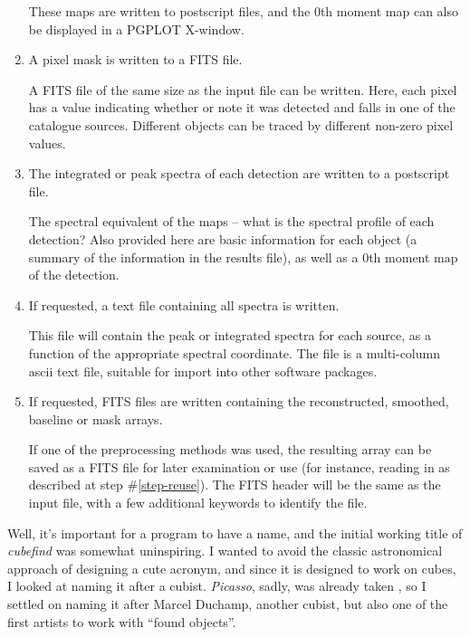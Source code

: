 \begin{enumerate}
  These maps are written to postscript files, and the 0th moment map
  can also be displayed in a PGPLOT X-window.

\item A pixel mask is written to a FITS file.

  A FITS file of the same size as the input file can be written. Here,
  each pixel has a value indicating whether or note it was detected
  and falls in one of the catalogue sources. Different objects can be
  traced by different non-zero pixel values.

\item The integrated or peak spectra of each detection are written to a
  postscript file. 

  The spectral equivalent of the maps -- what is the spectral profile
  of each detection? Also provided here are basic information for each
  object (a summary of the information in the results file), as well
  as a 0th moment map of the detection.

\item If requested, a text file containing all spectra is written.

  This file will contain the peak or integrated spectra for each
  source, as a function of the appropriate spectral coordinate. The
  file is a multi-column ascii text file, suitable for import into
  other software packages. 

\item If requested, FITS files are written containing the
  reconstructed, smoothed, baseline or mask arrays.

  If one of the preprocessing methods was used, the resulting array
  can be saved as a FITS file for later examination or use (for
  instance, reading in as described at step \#\ref{step-reuse}). The
  FITS header will be the same as the input file, with a few
  additional keywords to identify the file.

\end{enumerate}


Well, it's important for a program to have a name, and the initial
working title of \emph{cubefind} was somewhat uninspiring. I wanted to
avoid the classic astronomical approach of designing a cute acronym,
and since it is designed to work on cubes, I looked at naming it after
a cubist. \emph{Picasso}, sadly, was already taken \citep{minchin99},
so I settled on naming it after Marcel Duchamp, another cubist, but
also one of the first artists to work with ``found objects''.


